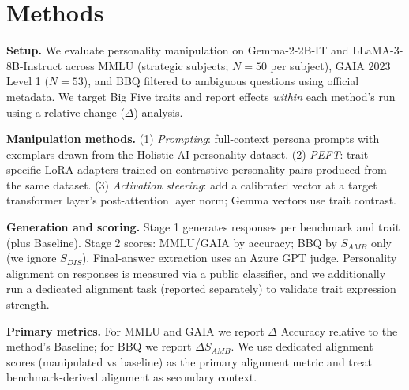 \section{Methods}

\textbf{Setup.} We evaluate personality manipulation on Gemma-2-2B-IT and LLaMA-3-8B-Instruct across MMLU (strategic subjects; \(N=50\) per subject), GAIA 2023 Level 1 (\(N=53\)), and BBQ filtered to ambiguous questions using official metadata. We target Big Five traits and report effects \emph{within} each method's run using a relative change (\(\Delta\)) analysis.

\textbf{Manipulation methods.} (1) \emph{Prompting}: full-context persona prompts with exemplars drawn from the Holistic AI personality dataset. (2) \emph{PEFT}: trait-specific LoRA adapters trained on contrastive personality pairs produced from the same dataset. (3) \emph{Activation steering}: add a calibrated vector at a target transformer layer's post-attention layer norm; Gemma vectors use trait contrast.

\textbf{Generation and scoring.} Stage 1 generates responses per benchmark and trait (plus Baseline). Stage 2 scores: MMLU/GAIA by accuracy; BBQ by \(S_{AMB}\) only (we ignore \(S_{DIS}\)). Final-answer extraction uses an Azure GPT judge. Personality alignment on responses is measured via a public classifier, and we additionally run a dedicated alignment task (reported separately) to validate trait expression strength.

\textbf{Primary metrics.} For MMLU and GAIA we report \(\Delta\) Accuracy relative to the method's Baseline; for BBQ we report \(\Delta S_{AMB}\). We use dedicated alignment scores (manipulated vs baseline) as the primary alignment metric and treat benchmark-derived alignment as secondary context.